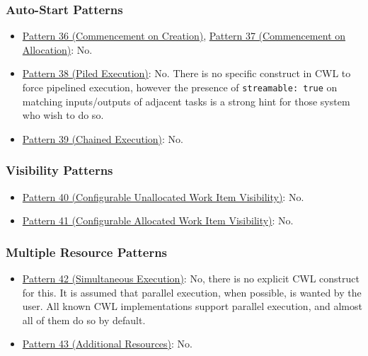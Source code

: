 \subsubsection{Auto-Start Patterns}
\begin{itemize}
\item \href{http://www.workflowpatterns.com/patterns/resource/autostart/wrp36.php}{Pattern 36 (Commencement on Creation)}, \href{http://www.workflowpatterns.com/patterns/resource/autostart/wrp37.php}{Pattern 37 (Commencement on Allocation)}: No.

\item \href{http://www.workflowpatterns.com/patterns/resource/autostart/wrp38.php}{Pattern 38 (Piled Execution)}: No. There is no specific construct in CWL to force pipelined execution, however the presence of \verb|streamable: true| on matching inputs/outputs of adjacent tasks is a strong hint for those system who wish to do so.

\item \href{http://www.workflowpatterns.com/patterns/resource/autostart/wrp39.php}{Pattern 39 (Chained Execution)}: No.
\end{itemize}
\subsubsection{Visibility Patterns}
\begin{itemize}
\item \href{http://www.workflowpatterns.com/patterns/resource/visibility/wrp40.php}{Pattern 40 (Configurable Unallocated Work Item Visibility)}: No.

\item \href{http://www.workflowpatterns.com/patterns/resource/visibility/wrp41.php}{Pattern 41 (Configurable Allocated Work Item Visibility)}: No.
\end{itemize}
\subsubsection{Multiple Resource Patterns}
\begin{itemize}
\item \href{http://www.workflowpatterns.com/patterns/resource/multiple_resources/wrp42.php}{Pattern 42 (Simultaneous Execution)}: No, there is no explicit CWL construct for this. It is assumed that parallel execution, when possible, is wanted by the user. All known CWL implementations support parallel execution, and almost all of them do so by default.

\item \href{http://www.workflowpatterns.com/patterns/resource/multiple_resources/wrp43.php}{Pattern 43 (Additional Resources)}: No.
\end{itemize}

